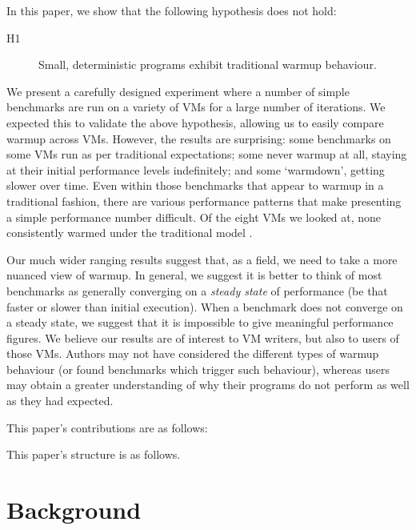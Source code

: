 \documentclass[10pt,preprint]{sigplanconf}
\newcommand{\hypone}{H1\xspace}
\begin{document}
In this paper, we show that the following hypothesis does not hold:
\begin{description}
  \item[\hypone] Small, deterministic programs exhibit traditional warmup behaviour.
\end{description}

We present a carefully designed
experiment where a number of simple benchmarks are run on a variety of
VMs for a large number of iterations. We expected this to validate the above
hypothesis, allowing us to easily compare warmup across VMs. However, the
results are surprising: some benchmarks on some VMs run as per traditional
expectations; some never warmup at all, staying at their initial performance
levels indefinitely; and some `warmdown', getting slower over time. Even within
those benchmarks that appear to warmup in a traditional fashion, there are
various performance patterns that make presenting a simple performance number
difficult. Of the eight VMs we looked at,
none consistently warmed under the traditional model .

Our much wider ranging results suggest that, as a
field, we need to take a more nuanced view
of warmup. In general, we suggest it is better to think of most benchmarks as
generally converging on a \emph{steady state} of performance (be that faster or
slower than initial execution). When a benchmark does not converge on a steady
state, we suggest that it is impossible to give meaningful performance figures.
We believe our results are of interest to VM writers, but also to users of
those VMs. Authors may not have considered the different types of warmup
behaviour (or found benchmarks which trigger such behaviour), whereas users may
obtain a greater understanding of why their programs do not perform as well as
they had expected.

This paper's contributions are as follows:
\begin{enumerate*}
  \item {}
\end{enumerate*}

This paper's structure is as follows. 


\section{Background}
\label{sec:warmup}
\end{document}
